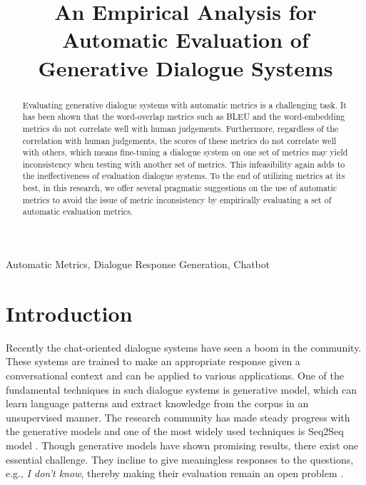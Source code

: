 \documentclass[conference]{IEEEtran}
\begin{document}
\title{An Empirical Analysis for Automatic Evaluation of Generative Dialogue Systems}

\author{
}

\maketitle

\begin{abstract}
      Evaluating generative dialogue systems with automatic metrics is a challenging task. It has been shown that the word-overlap metrics such as BLEU and the word-embedding metrics do not correlate well with human judgements. Furthermore, regardless of the correlation with human judgements, the scores of these metrics do not correlate well with others, which means fine-tuning a dialogue system on one set of metrics may yield inconsistency when testing with another set of metrics. This infeasibility again adds to the ineffectiveness of evaluation dialogue systems. To the end of utilizing metrics at its best, in this research, we offer several pragmatic suggestions on the use of automatic metrics to avoid the issue of metric inconsistency by empirically evaluating a set of automatic evaluation metrics.
\end{abstract}

\begin{IEEEkeywords}
Automatic Metrics, Dialogue Response Generation, Chatbot
\end{IEEEkeywords}

\section{Introduction}
Recently the chat-oriented dialogue systems have seen a boom in the community. These systems are trained to make an appropriate response given a conversational context and can be applied to various applications. One of the fundamental techniques in such dialogue systems is generative model, which can learn language patterns and extract knowledge from the corpus in an unsupervised manner. The research community has made steady progress with the generative models and one of the most widely used techniques is Seq2Seq model \cite{Seq2Seq}. Though generative models have shown promising results, there exist one essential challenge. They incline to give meaningless responses to the questions, e.g., \textit{I don't know}, thereby making their evaluation remain an open problem \cite{HowNot}.
\end{document}
